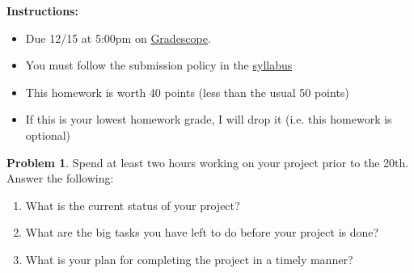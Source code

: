 \documentclass[12pt]{article}
\theoremstyle{definition}
\newtheorem{problem}{Problem}
\begin{document}
\textbf{\Large{}}
    
    \vspace{-1.8em}
    \hrulefill
 
\textbf{Instructions:}
    \begin{itemize}
        \item Due 12/15 at 5:00pm on \href{https://www.gradescope.com/courses/570477/}{Gradescope}.
        \item You must follow the submission policy in the \href{https://courses.chen.pw/na_f2023/syllabus.html}{syllabus} 
        \item This homework is worth 40 points (less than the usual 50 points)
        \item If this is your lowest homework grade, I will drop it (i.e. this homework is optional)
\end{itemize}
   
\vspace{.5em}


\begin{problem}
    Spend at least two hours working on your project prior to the 20th. 
    Answer the following:
    \begin{enumerate}
        \item What is the current status of your project? 
        \item What are the big tasks you have left to do before your project is done?
        \item What is your plan for completing the project in a timely manner?
    \end{enumerate}
\end{problem}
\end{document}
